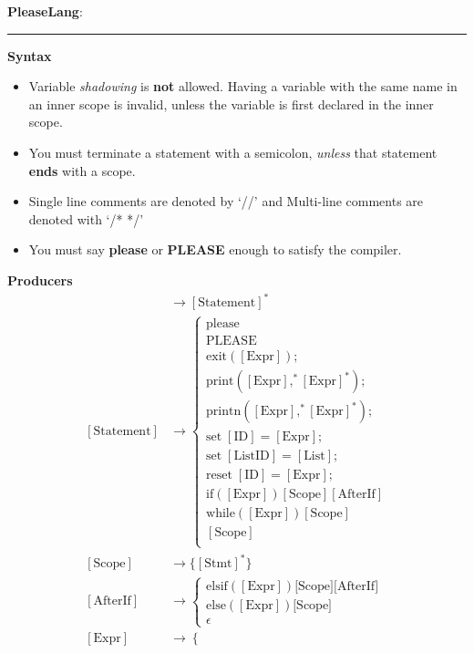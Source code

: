 \documentclass[11pt]{article}
\newcommand{\hwheadings}[3]{
{{\bf PleaseLang}: \chapsec } \hfill {{ \yourname }} \hfill {{ \course #1}}
\rule[0.051in]{\textwidth}{0.0025in}
}
\begin{document}
\hwheadings{}{}{}
\textbf{Syntax}
\begin{itemize}
  \item Variable \textit{shadowing} is \textbf{not} allowed. Having a variable with the same name 
    in an inner scope is invalid, unless the variable is first 
    declared in the inner scope. 
  \item You must terminate a statement with a semicolon, \textit{unless} that 
    statement \textbf{ends} with a scope. 
  \item Single line comments are denoted by `//' and Multi-line comments are denoted with `/* */'
  \item You must say \textbf{please} or \textbf{PLEASE} enough to satisfy the compiler.
\end{itemize}
\textbf{Producers}
\begin{align*}
  [\text{Program}] &\to [\text{Statement}]^* \\
  [\text{Statement}] &\to 
  \begin{cases}
    \text{please} \\
    \text{PLEASE} \\
    \text{exit}([\text{Expr}]); \\ 
    \text{print}([\text{Expr}] ,^* [\text{Expr}]^*); \\ 
    \text{printn}([\text{Expr}] ,^* [\text{Expr}]^*); \\ 
    \text{set} \; [\text{ID}] = [\text{Expr}]; \\
    \text{set} \; [\text{ListID}] = [\text{List}]; \\
    \text{reset} \; [\text{ID}] = [\text{Expr}]; \\
    \text{if} ([\text{Expr}])[\text{Scope}][\text{AfterIf}]  \\
    \text{while} ([\text{Expr}])[\text{Scope}] \\
    [\text{Scope}] \\
  \end{cases} \\
  [\text{Scope}] &\to \{[\text{Stmt}]^*\} \\
  [\text{AfterIf}] &\to 
  \begin{cases}
    \text{elsif}([\text{Expr}])\text{[Scope]}\text{[AfterIf]} \\
    \text{else}([\text{Expr}])\text{[Scope]} \\
    \epsilon
  \end{cases} \\
  [\text{Expr}] &\to 
  \begin{cases}

\end{cases}
\end{align*}
\end{document}
